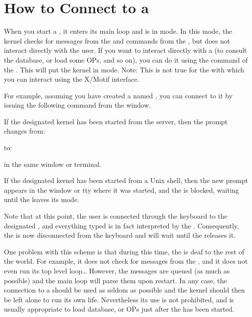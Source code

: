 \section{How to Connect to a \CPK{}}

When you start a \CPK{}, it enters its main loop and is in  mode. In
this mode, the kernel checks for messages from the \MP{} and commands from the
\OPRSS{}, but does not interact directly with the user. If you want to
interact directly with a \CPK{} (to consult the database, or load some OPs, and
so on), you can do it using the  command of the \OPRSS{}. This
will put the kernel in  mode. Note: This is not true for the \XPK{}
with which you can interact using the X/Motif interface.

For example, assuming you have created a \CPK{} named , you can
connect to it by issuing the following command from the \OPRSS{} window.


If the designated kernel has been started from the server, then the prompt
changes from:


to:


in the same window or terminal.

If the designated kernel has been started from a Unix shell, then the new prompt
appears in the window or tty where it was started, and the \OPRSS{} is
blocked, waiting until the \CPK{} leaves its  mode.

Note that at this point, the user is connected through the keyboard to the
designated \CPK{}, and everything typed is in fact interpreted by
the \CPK{}. Consequently, the \OPRSS{} is now disconnected from
the keyboard and will wait until the \CPK{} releases it.

One problem with this scheme is that during this time, the \CPK{} is deaf to
the rest of the world. For example, it does not check for messages from the
\MP{}, and it does not even run its top level loop\dots{} However, the messages
are queued (as much as possible) and the main loop will parse them upon
restart.  In any case, the connection to a \CPK{} should be used as seldom as
possible and the kernel should then be left alone to run its own life.
Nevertheless its use is not prohibited, and is usually appropriate to load
database, or OPs just after the \CPK{} has been started.

